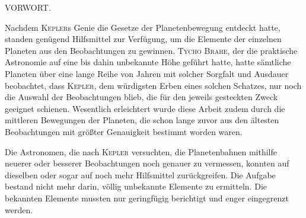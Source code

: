 \clearpage
{}
\begin{center}\Large VORWORT.\end{center}
\medskip
{}Nachdem \textsc{Kepler}s Genie die Gesetze der Planetenbewegung entdeckt hatte, standen genügend Hilfsmittel zur Verfügung, um die Elemente der einzelnen Planeten aus den Beobachtungen zu gewinnen. \textsc{Tycho Brahe}, der die praktische Astronomie auf eine bis dahin unbekannte Höhe geführt hatte, hatte sämtliche Planeten über eine lange Reihe von Jahren mit solcher Sorgfalt und Ausdauer beobachtet, dass \textsc{Kepler}, dem würdigsten Erben eines solchen Schatzes, nur noch die Auswahl der Beobachtungen blieb, die für den jeweils gesteckten Zweck geeignet schienen. Wesentlich erleichtert wurde diese Arbeit zudem durch die mittleren Bewegungen der Planeten, die schon lange zuvor aus den ältesten Beobachtungen mit größter Genauigkeit bestimmt worden waren.

Die Astronomen, die nach \textsc{Kepler} versuchten, die Planetenbahnen mithilfe neuerer oder besserer Beobachtungen noch genauer zu vermessen, konnten auf dieselben oder sogar auf noch mehr Hilfsmittel zurückgreifen. Die Aufgabe bestand nicht mehr darin, völlig unbekannte Elemente zu ermitteln. Die bekannten Elemente mussten nur geringfügig berichtigt und enger eingegrenzt werden.

